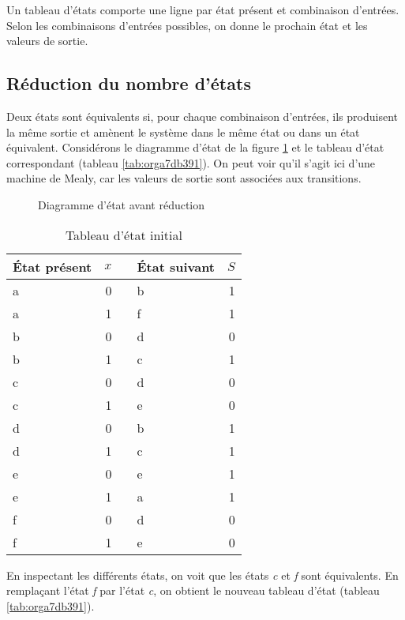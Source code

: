 \documentclass[11pt]{article}
\begin{document}
Un tableau d'états comporte une ligne par état présent et combinaison
d'entrées. Selon les combinaisons d'entrées possibles, on donne le
prochain état et les valeurs de sortie.

\subsection{Réduction du nombre d'états}
\label{sec:orgedd16f5}

Deux états sont équivalents si, pour chaque combinaison d'entrées, ils
produisent la même sortie et amènent le système dans le même état ou
dans un état équivalent. Considérons le diagramme d'état de la figure
\ref{fig:org3fac35e} et le tableau d'état correspondant (tableau 
\ref{tab:orga7db391}). On peut voir qu'il s'agit ici d'une machine de
Mealy, car les valeurs de sortie sont associées aux transitions.


\begin{figure}[htbp]
\centering

\caption{\label{fig:org3fac35e}Diagramme d'état avant réduction}
\end{figure}


\begin{table}[htbp]
\caption{\label{tab:orgf216330}Tableau d'état initial}
\centering
\begin{tabular}{lrllr}
État présent & \(x\) &  & État suivant & \(S\)\\
\hline
a & 0 &  & b & 1\\
a & 1 &  & f & 1\\
b & 0 &  & d & 0\\
b & 1 &  & c & 1\\
c & 0 &  & d & 0\\
c & 1 &  & e & 0\\
d & 0 &  & b & 1\\
d & 1 &  & c & 1\\
e & 0 &  & e & 1\\
e & 1 &  & a & 1\\
f & 0 &  & d & 0\\
f & 1 &  & e & 0\\
\end{tabular}
\end{table}

En inspectant les différents états, on voit que les états \emph{c} et \emph{f}
sont équivalents. En remplaçant l'état \emph{f} par l'état \emph{c}, on obtient
le nouveau tableau d'état (tableau \ref{tab:orga7db391}).
\end{document}
